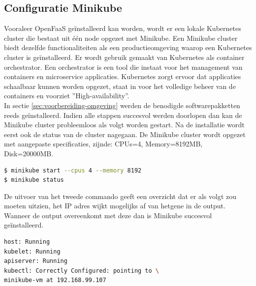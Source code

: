 \subsection{Configuratie Minikube}
\label{sec:configuratie-minikube}
Vooraleer OpenFaaS geïnstalleerd kan worden, wordt er een lokale Kubernetes cluster die bestaat uit één node opgezet met Minikube. Een Minikube cluster biedt dezelfde functionaliteiten als een productieomgeving waarop een Kubernetes cluster is geïnstalleerd. Er wordt gebruik gemaakt van Kubernetes als container orchestrator. Een orchestrator is een tool die instaat voor het management van containers en microservice applicaties. Kubernetes zorgt ervoor dat applicaties schaalbaar kunnen worden opgezet, staat in voor het volledige beheer van de containers en voorziet ''High-availability''.
\\
In sectie \ref{sec:voorbereiding-omgeving} werden de benodigde softwarepakketten reeds geïnstalleerd. Indien alle stappen succesvol werden doorlopen dan kan de Minikube cluster probleemloos als volgt worden gestart. Na de installatie wordt eerst ook de status van de cluster nagegaan. De Minikube cluster wordt opgezet met aangepaste specificaties, zijnde: CPUs=4, Memory=8192MB, Disk=20000MB.

\begin{lstlisting}[language=bash]
$ minikube start --cpus 4 --memory 8192
$ minikube status
\end{lstlisting}

De uitvoer van het tweede commando geeft een overzicht dat er als volgt zou moeten uitzien, het IP adres wijkt mogelijks af van hetgene in de output. Wanneer de output overeenkomt met deze dan is Minikube succesvol geïnstalleerd.
\begin{lstlisting}[language=bash]
host: Running
kubelet: Running
apiserver: Running
kubectl: Correctly Configured: pointing to \ 
minikube-vm at 192.168.99.107
\end{lstlisting}

